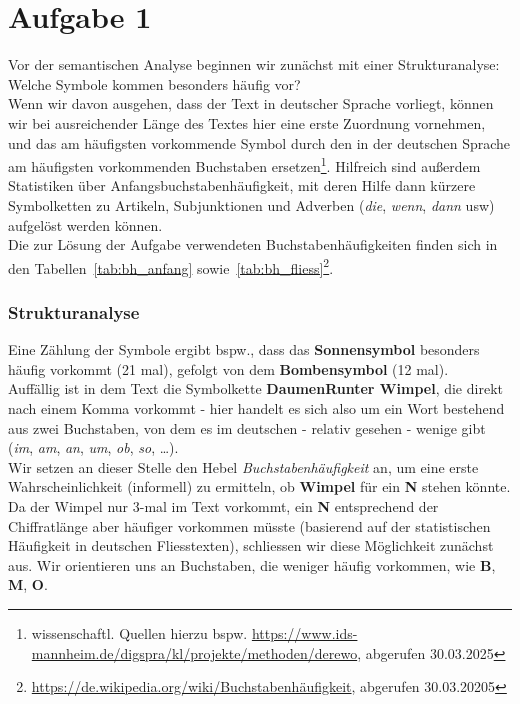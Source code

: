 \chapter{Aufgabe 1}

\noindent
Vor der semantischen Analyse beginnen wir zunächst mit einer Strukturanalyse: Welche Symbole kommen besonders häufig vor?\\
Wenn wir davon ausgehen, dass der Text in deutscher Sprache vorliegt, können wir bei ausreichender Länge des Textes hier eine erste Zuordnung vornehmen, und das am häufigsten vorkommende Symbol durch den in der deutschen Sprache am häufigsten vorkommenden Buchstaben ersetzen\footnote{
wissenschaftl. Quellen hierzu bspw. \url{https://www.ids-mannheim.de/digspra/kl/projekte/methoden/derewo}, abgerufen 30.03.2025
}.
Hilfreich sind außerdem Statistiken über Anfangsbuchstabenhäufigkeit, mit deren Hilfe dann kürzere Symbolketten zu Artikeln, Subjunktionen und Adverben (\textit{die}, \textit{wenn}, \textit{dann} usw) aufgelöst werden können.\\
Die zur Lösung der Aufgabe verwendeten Buchstabenhäufigkeiten finden sich in den Tabellen~\ref{tab:bh_anfang} sowie~\ref{tab:bh_fliess}\footnote{
\url{https://de.wikipedia.org/wiki/Buchstabenhäufigkeit}, abgerufen 30.03.20205
}.\\

\subsection*{Strukturanalyse}
\noindent
Eine Zählung der Symbole ergibt bspw., dass das \textbf{Sonnensymbol} besonders häufig vorkommt (21 mal), gefolgt von dem \textbf{Bombensymbol} (12 mal).\\

\noindent
Auffällig ist in dem Text die Symbolkette \textbf{DaumenRunter Wimpel}, die direkt nach einem Komma vorkommt - hier handelt es sich also um ein Wort bestehend aus zwei Buchstaben, von dem es im deutschen - relativ gesehen - wenige gibt (\textit{im}, \textit{am}, \textit{an}, \textit{um}, \textit{ob}, \textit{so}, \ldots).\\

\noindent
Wir setzen an dieser Stelle den Hebel \textit{Buchstabenhäufigkeit} an, um eine erste Wahrscheinlichkeit (informell) zu ermitteln, ob  \textbf{Wimpel} für ein \textbf{N} stehen könnte.
Da der Wimpel nur 3-mal im Text vorkommt, ein \textbf{N} entsprechend der Chiffratlänge aber häufiger vorkommen müsste (basierend auf der statistischen Häufigkeit in deutschen Fliesstexten), schliessen wir diese Möglichkeit zunächst aus.
Wir orientieren uns an Buchstaben, die weniger häufig vorkommen, wie \textbf{B}, \textbf{M}, \textbf{O}.\\

